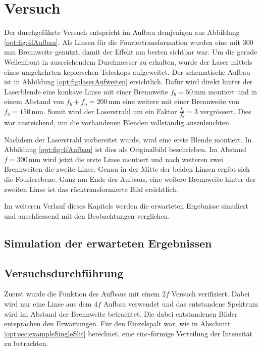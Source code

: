 %
%
%
%
\section{Versuch
  \label{opt:section:versuch}}

Der durchgeführte Versuch entspricht im Aufbau demjenigen aus Abbildung \ref{opt:fig:4fAufbau}.
Als Linsen für die Fouriertransformation wurden eine mit 300 mm Brennweite genutzt, damit der Effekt am besten sichtbar war.
Um die gerade Wellenfront in ausreichendem Durchmesser zu erhalten, wurde der Laser mittels eines umgekehrten keplerschen Teleskops aufgeweitet.
Der schematische Aufbau ist in Abbildung \ref{opt:fig:laserAufweiten} ersichtlich.
Dafür wird direkt hinter der Laserblende eine konkave Linse mit einer Brennweite $f_b = 50\,\text{mm}$ montiert 
und in einem Abstand von $f_b + f_o = 200\,\text{mm}$ eine weitere mit einer Brennweite von $f_o = 150\,\text{mm}$.
Somit wird der Laserstrahl um ein Faktor $\frac{f_o}{f_b} = 3$ vergrössert.
Dies war ausreichend, um die vorhandenen Blenden vollständig auszuleuchten.

Nachdem der Laserstrahl vorbereitet wurde, wird eine erste Blende montiert.
In Abbildung \ref{opt:fig:4fAufbau} ist dies als Originalbild beschrieben.
Im Abstand $f=300\,\text{mm}$ wird jetzt die erste Linse montiert und nach weiteren zwei Brennweiten die zweite Linse.
Genau in der Mitte der beiden Linsen ergibt sich die Fourierebene.
Ganz am Ende des Aufbaus, eine weitere Brennweite hinter der zweiten Linse ist das rücktransformierte Bild ersichtlich.

Im weiteren Verlauf dieses Kapitels werden die erwarteten Ergebnisse simuliert und anschliessend mit den Beobachtungen verglichen.

\subsection{Simulation der erwarteten Ergebnissen}

\subsection{Versuchsdurchführung}
Zuerst wurde die Funktion des Aufbaus mit einem $2f$ Versuch verifiziert.
Dabei wird nur eine Linse aus dem $4f$ Aufbau verwendet und das entstandene Spektrum wird im Abstand der Brennweite betrachtet.
Die dabei entstandenen Bilder entsprachen den Erwartungen.
Für den Einzelspalt war, wie in Abschnitt \ref{opt:sec:exampleSingleSlit} berechnet, eine sinc-förmige Verteilung der Intensität zu betrachten.

